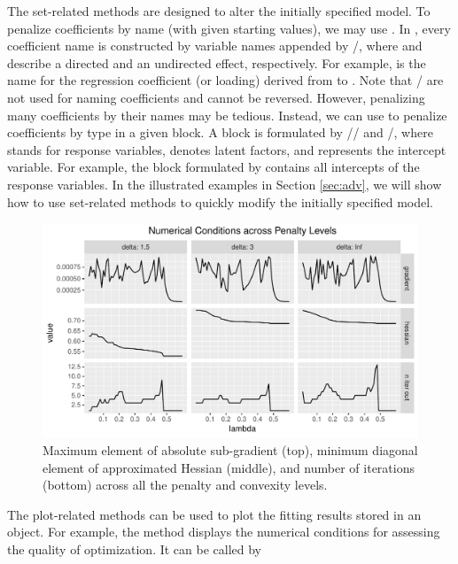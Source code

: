 \documentclass[nojss]{jss}
\begin{document}
The set-related methods are designed to alter the initially specified model. To penalize coefficients by name (with given starting values), we may use . In , every coefficient name is constructed by variable names appended by \code{<-}/\code{<->}, where \code{<-} and \code{<->} describe a directed and an undirected effect, respectively. For example,  is the name for the regression coefficient (or loading) derived from  to . Note that \code{<=:}/\code{<~:} are not used for naming coefficients and \code{<-} cannot be reversed. However, penalizing many coefficients by their names may be tedious. Instead, we can use  to penalize coefficients by type in a given block. A block is formulated by // and \code{<-}/\code{<->}, where  stands for response variables,  denotes latent factors, and  represents the intercept variable. For example, the block formulated by  contains all intercepts of the response variables. In the illustrated examples in Section \ref{sec:adv}, we will show how to use set-related methods to quickly modify the initially specified model.

\begin{figure}[t!]
\centering
\includegraphics{vignette-lslx-011}
\caption{\label{fig:num_cond}Maximum element of absolute sub-gradient (top), minimum diagonal element of approximated Hessian (middle), and number of iterations (bottom) across all the penalty and convexity levels. }
\end{figure}


The plot-related methods can be used to plot the fitting results stored in an  object. For example, the  method displays the numerical conditions for assessing the quality of optimization. It can be called by
\begin{Schunk}
\end{Schunk}
\end{document}
